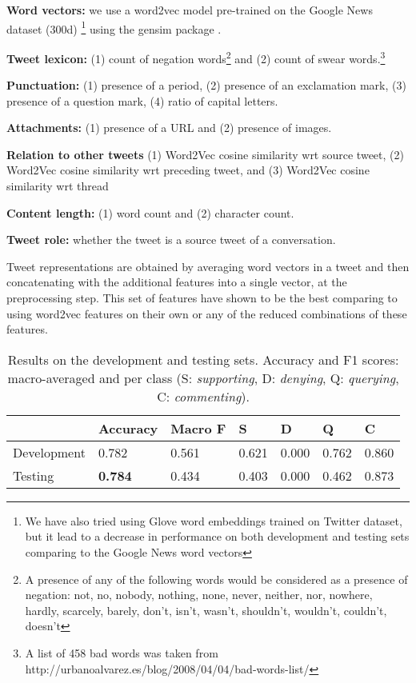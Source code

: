 \documentclass[11pt,a4paper]{article}
\begin{document}
\begin{compactitem}
    \item \textbf{Word vectors:} we use a word2vec \cite{mikolov2013efficient} model pre-trained on the Google News dataset (300d)  \footnote{We have also tried using Glove word embeddings trained on Twitter dataset, but it lead to a decrease in performance on both development and testing sets comparing to the Google News word vectors} using the gensim package \cite{rehurek_lrec}. 
	\item \textbf{Tweet lexicon:} (1) count of negation words\footnote{A presence of any of the following words would be considered as a presence of negation: not, no, nobody, nothing, none, never, neither, nor, nowhere, hardly, scarcely, barely, don't, isn't, wasn't, shouldn't, wouldn't, couldn't, doesn't} and (2) count of swear words.\footnote{A list of 458 bad words was taken from http://urbanoalvarez.es/blog/2008/04/04/bad-words-list/} 
	\item \textbf{Punctuation:} (1) presence of a period, (2) presence of an exclamation mark, (3) presence of a question mark, (4) ratio of capital letters.
	\item \textbf{Attachments:} (1) presence of a URL and (2) presence of images.
	\item \textbf{Relation to other tweets} (1) Word2Vec cosine similarity wrt source tweet, (2) Word2Vec cosine similarity wrt preceding tweet, and (3) Word2Vec cosine similarity wrt thread
	\item \textbf{Content length:} (1) word count and (2) character count.
	\item \textbf{Tweet role:} whether the tweet is a source tweet of a conversation.
\end{compactitem}
Tweet representations are obtained by averaging word vectors in a tweet and then concatenating with the additional features into a single vector, at the preprocessing step. This set of features have shown to be the best  comparing to using word2vec features on their own or any of the reduced combinations of these features.
\begin{table*}[t]
 	\centering
\begin{tabular}{ | l | l | l | l | l | l | l | }
 		\hline
	 &  \textbf{Accuracy} &  \textbf{Macro F} &  \textbf{S} &  \textbf{D} &  \textbf{Q} &  \textbf{C} \\ \hline
	Development & 0.782 & 0.561 & 0.621 & 0.000 & 0.762 & 0.860 \\ \hline
	Testing &  \textbf{0.784} & 0.434 & 0.403 & 0.000 & 0.462 & 0.873 \\ \hline
 	\end{tabular}\caption{Results on the development and testing sets. Accuracy and F1 scores: macro-averaged and per class (S: \textit{supporting}, D: \textit{denying}, Q: \textit{querying}, C: \textit{commenting}).}
 	\label{result_main}
 \end{table*}
\end{document}
